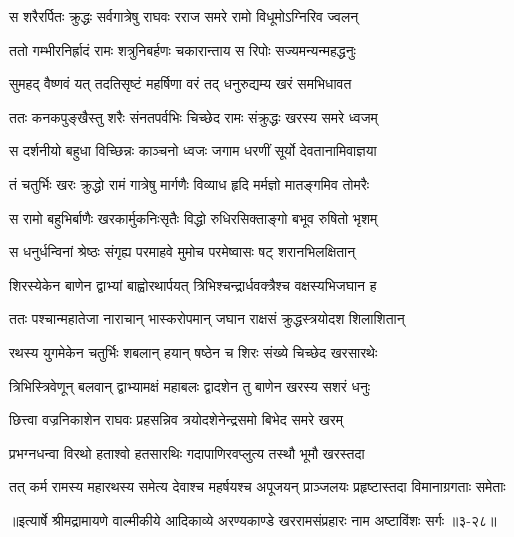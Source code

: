 \twolineshloka
{स शरैरर्पितः क्रुद्धः सर्वगात्रेषु राघवः}
{रराज समरे रामो विधूमोऽग्निरिव ज्वलन्} %

\twolineshloka
{ततो गम्भीरनिर्ह्रादं रामः शत्रुनिबर्हणः}
{चकारान्ताय स रिपोः सज्यमन्यन्महद्धनुः} %

\twolineshloka
{सुमहद् वैष्णवं यत् तदतिसृष्टं महर्षिणा}
{वरं तद् धनुरुद्यम्य खरं समभिधावत} %

\twolineshloka
{ततः कनकपुङ्खैस्तु शरैः संनतपर्वभिः}
{चिच्छेद रामः संक्रुद्धः खरस्य समरे ध्वजम्} %

\twolineshloka
{स दर्शनीयो बहुधा विच्छिन्नः काञ्चनो ध्वजः}
{जगाम धरणीं सूर्यो देवतानामिवाज्ञया} %

\twolineshloka
{तं चतुर्भिः खरः क्रुद्धो रामं गात्रेषु मार्गणैः}
{विव्याध हृदि मर्मज्ञो मातङ्गमिव तोमरैः} %

\twolineshloka
{स रामो बहुभिर्बाणैः खरकार्मुकनिःसृतैः}
{विद्धो रुधिरसिक्ताङ्गो बभूव रुषितो भृशम्} %

\twolineshloka
{स धनुर्धन्विनां श्रेष्ठः संगृह्य परमाहवे}
{मुमोच परमेष्वासः षट् शरानभिलक्षितान्} %

\twolineshloka
{शिरस्येकेन बाणेन द्वाभ्यां बाह्वोरथार्पयत्}
{त्रिभिश्चन्द्रार्धवक्त्रैश्च वक्षस्यभिजघान ह} %

\twolineshloka
{ततः पश्चान्महातेजा नाराचान् भास्करोपमान्}
{जघान राक्षसं क्रुद्धस्त्रयोदश शिलाशितान्} %

\twolineshloka
{रथस्य युगमेकेन चतुर्भिः शबलान् हयान्}
{षष्ठेन च शिरः संख्ये चिच्छेद खरसारथेः} %

\twolineshloka
{त्रिभिस्त्रिवेणून् बलवान् द्वाभ्यामक्षं महाबलः}
{द्वादशेन तु बाणेन खरस्य सशरं धनुः} %

\twolineshloka
{छित्त्वा वज्रनिकाशेन राघवः प्रहसन्निव}
{त्रयोदशेनेन्द्रसमो बिभेद समरे खरम्} %

\twolineshloka
{प्रभग्नधन्वा विरथो हताश्वो हतसारथिः}
{गदापाणिरवप्लुत्य तस्थौ भूमौ खरस्तदा} %

\twolineshloka
{तत् कर्म रामस्य महारथस्य समेत्य देवाश्च महर्षयश्च}
{अपूजयन् प्राञ्जलयः प्रहृष्टास्तदा विमानाग्रगताः समेताः} %


॥इत्यार्षे श्रीमद्रामायणे वाल्मीकीये आदिकाव्ये अरण्यकाण्डे खररामसंप्रहारः नाम अष्टाविंशः सर्गः ॥३-२८॥
